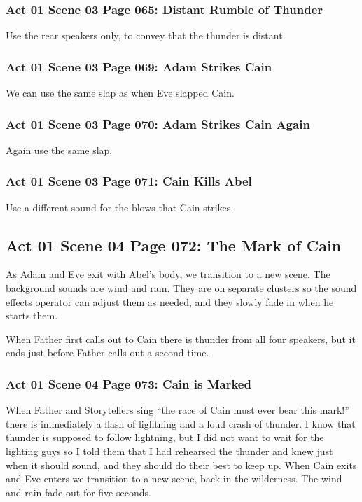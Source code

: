 \documentclass[letterpaper,twoside]{article}
\begin{document}
\subsubsection{Act 01 Scene 03 Page 065: Distant Rumble of Thunder}
Use the rear speakers only, to convey that the thunder is distant.

\subsubsection{Act 01 Scene 03 Page 069: Adam Strikes Cain}
We can use the same slap as when Eve slapped Cain.

\subsubsection{Act 01 Scene 03 Page 070: Adam Strikes Cain Again}
Again use the same slap.

\subsubsection{Act 01 Scene 03 Page 071: Cain Kills Abel}
Use a different sound for the blows that Cain strikes.

\subsection{Act 01 Scene 04 Page 072: The Mark of Cain}
As Adam and Eve exit with Abel's body, we transition to a new
scene.  The background sounds are wind and rain.  They are
on separate clusters so the sound effects operator can adjust
them as needed, and they slowly fade in when he starts them.

When Father first calls out to Cain there is thunder from
all four speakers, but it ends just before Father calls out
a second time.

\subsubsection{Act 01 Scene 04 Page 073: Cain is Marked}
When Father and Storytellers sing
``the race of Cain must ever bear this mark!''
there is immediately a flash of lightning and a loud crash of thunder.
I know that thunder is supposed to follow lightning, but I did not
want to wait for the lighting guys so I told them that I had rehearsed
the thunder and knew just when it should sound, and they should do
their best to keep up.
When Cain exits and Eve enters we transition to a new scene,
back in the wilderness.  The wind and rain fade out for five seconds.
\end{document}
